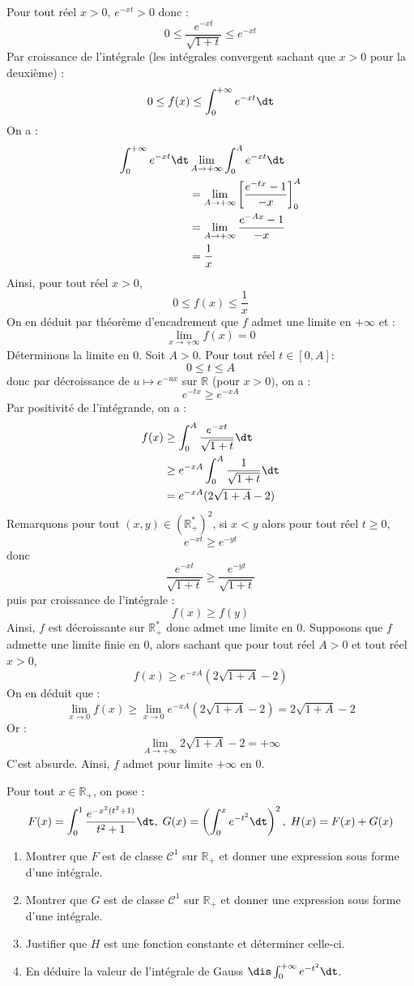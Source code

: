 \documentclass[a4paper,10pt]{report}
\begin{document}
\begin{enumerate}
Pour tout réel $x>0$, $e^{-xt} > 0$ donc :
$$  0 \leq \dfrac{e^{-xt}}{\sqrt{1+t}} \leq e^{-xt}$$
Par croissance de l'intégrale (les intégrales convergent sachant que $x>0$ pour la deuxième) :
$$ 0 \leq f(x) \leq \int_0^{+ \infty} e^{-xt} \dt$$
On a :
\begin{align*}
\int_0^{+ \infty} e^{-xt} \dt & \lim_{A \rightarrow + \infty} \int_0^{A} e^{-xt} \dt \\
& = \lim_{A \rightarrow + \infty} \left[ \dfrac{e^{-tx}-1}{-x} \right]_0^A \\
&  = \lim_{A \rightarrow + \infty} \dfrac{e^{-Ax}-1}{-x} \\
& = \dfrac{1}{x}
\end{align*}
Ainsi, pour tout réel $x>0$,
$$ 0 \leq f(x) \leq \dfrac{1}{x}$$
On en déduit par théorème d'encadrement que $f$ admet une limite en $+ \infty$ et :
$$ \lim_{x \rightarrow + \infty} f(x) = 0$$
Déterminons la limite en $0$. Soit $A >0$. Pour tout réel $t \in [0,A]$:
$$ 0 \leq t \leq A$$
donc par décroissance de $u \mapsto e^{-ux}$ sur $\mathbb{R}$ (pour $x>0)$, on a :
$$  e^{-tx} \geq  e^{-xA}$$
Par positivité de l'intégrande, on a :
\begin{align*}
 f(x) & \geq \int_0^{A} \dfrac{e^{-xt}}{\sqrt{1+t}}  \dt  \\
 & \geq e^{-xA} \int_0^A \dfrac{1}{\sqrt{1+t}}  \dt  \\ 
 & = e^{-xA} (2 \sqrt{1+A}-2) 
\end{align*}
Remarquons pour tout $(x,y) \in (\mathbb{R}_+^*)^2$, si $x<y$ alors pour tout réel $t \geq 0$,
$$ e^{-xt} \geq e^{-yt}$$
donc 
$$ \dfrac{e^{-xt}}{\sqrt{1+t}} \geq \dfrac{e^{-yt}}{\sqrt{1+t}}$$
puis par croissance de l'intégrale :
$$ f(x) \geq f(y)$$
Ainsi, $f$ est décroissante sur $\mathbb{R}_+^*$ donc admet une limite en $0$. Supposons que $f$ admette une limite finie en $0$, alors sachant que pour tout réel $A>0$ et tout réel $x>0$,
$$ f(x) \geq  e^{-xA} (2 \sqrt{1+A}-2) $$
On en déduit que :
$$ \lim_{x \rightarrow 0} f(x) \geq \lim_{x \rightarrow 0} e^{-xA} (2 \sqrt{1+A}-2) = 2 \sqrt{1+A}-2$$
Or :
$$ \lim_{A \rightarrow + \infty} 2 \sqrt{1+A}-2 = + \infty$$
C'est absurde. Ainsi, $f$ admet pour limite $+ \infty$ en $0$.
\end{enumerate}

\begin{Exa} Pour tout $x \in \mathbb{R}_+$, on pose :
 $$ F(x) = \int_{0}^1 \frac{e^{-x^2(t^2+1)}}{t^2+1} \dt, \; G(x) = \left( \int_{0}^x e^{-t^2} \dt \right)^2, \; H(x)=F(x)+G(x)$$
 
 \begin{enumerate}
 \item Montrer que $F$ est de classe $\mathcal{C}^1$ sur $\mathbb{R}_+$ et donner une expression sous forme d'une intégrale.
 \item Montrer que $G$ est de classe $\mathcal{C}^1$ sur $\mathbb{R}_+$ et donner une expression sous forme d'une intégrale.
 \item Justifier que $H$ est une fonction constante et déterminer celle-ci.
 \item En déduire la valeur de l'intégrale de Gauss $\dis \int_{0}^{+ \infty} e^{-t^2} \dt$.
 \end{enumerate}
\end{Exa}
\end{document}
